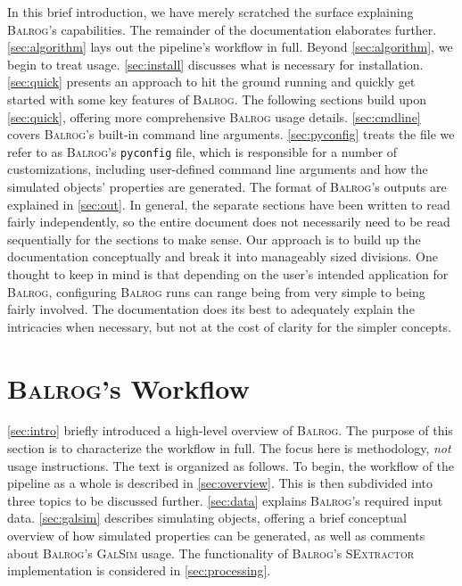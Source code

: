 \documentclass[11pt]{book}
\newcommand{\codett}[1]{\lstinline{#1}}
\newcommand{\pyconfig}{\codett{pyconfig}}
\newcommand{\galsim}{\textsc{GalSim}}
\newcommand{\balrog}{\textsc{Balrog}}
\newcommand{\sex}{\textsc{SExtractor}}
\begin{document}
In this brief introduction, we have merely scratched the surface explaining \balrog{}'s capabilities. 
The remainder of the documentation elaborates further.
\autoref{sec:algorithm} lays out the pipeline's workflow in full.
Beyond \autoref{sec:algorithm}, we begin to treat usage.
\autoref{sec:install} discusses what is necessary for installation.
\autoref{sec:quick} presents an approach to hit the ground running and quickly get started with some key features of \balrog{}.
The following sections build upon \autoref{sec:quick}, offering more comprehensive \balrog{} usage details.
\autoref{sec:cmdline} covers \balrog{}'s built-in command line arguments.
\autoref{sec:pyconfig} treats the file we refer to as \balrog{}'s \pyconfig{} file, which is responsible for a number of customizations,
including user-defined command line arguments and how the simulated objects' properties are generated.
The format of \balrog{}'s outputs are explained in \autoref{sec:out}.
In general, the separate sections have been written to read fairly independently,
so the entire document does not necessarily need to be read sequentially for the sections to make sense.
Our approach is to build up the documentation conceptually and break it into manageably sized divisions.
One thought to keep in mind is that depending on the user's intended application for \balrog{},
configuring \balrog{} runs can range being from very simple to being fairly involved.
The documentation does its best to adequately explain the intricacies when necessary,
but not at the cost of clarity for the simpler concepts.


\chapter{\balrog{}'s Workflow}
\label{sec:algorithm}

\autoref{sec:intro} briefly introduced a high-level overview of \balrog{}.
The purpose of this section is to characterize the workflow in full.
The focus here is methodology, \textit{not} usage instructions. 
The text is organized as follows.
To begin, the workflow of the pipeline as a whole is described in \autoref{sec:overview}.
This is then subdivided into three topics to be discussed further.
\autoref{sec:data} explains \balrog{}'s required input data.
\autoref{sec:galsim} describes simulating objects,
offering a brief conceptual overview of how simulated properties can be generated, as well as comments about \balrog{}'s \galsim{} usage.
The functionality of \balrog{}'s \sex{} implementation is considered in \autoref{sec:processing}.
\end{document}
